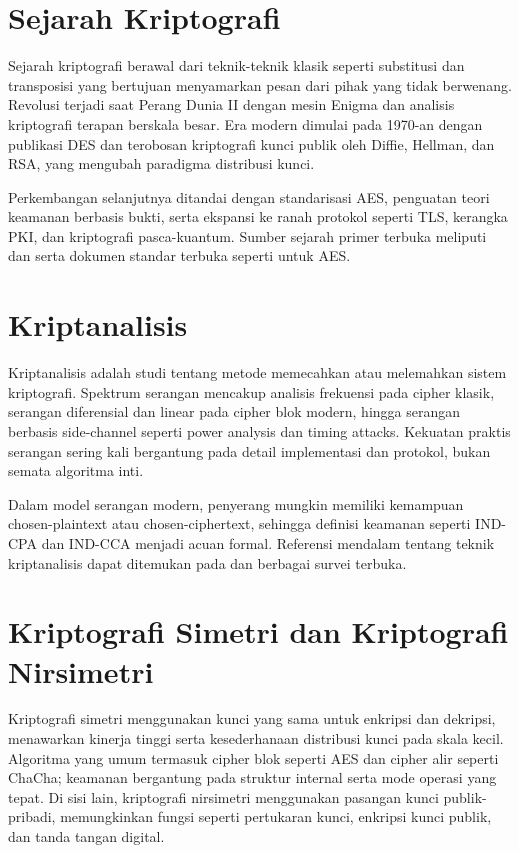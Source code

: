 \documentclass[../main.tex]{subfiles}
\begin{document}
\section{Sejarah Kriptografi}
Sejarah kriptografi berawal dari teknik-teknik klasik seperti substitusi dan transposisi yang bertujuan menyamarkan pesan dari pihak yang tidak berwenang. Revolusi terjadi saat Perang Dunia II dengan mesin Enigma dan analisis kriptografi terapan berskala besar. Era modern dimulai pada 1970-an dengan publikasi DES dan terobosan kriptografi kunci publik oleh Diffie, Hellman, dan RSA, yang mengubah paradigma distribusi kunci.

Perkembangan selanjutnya ditandai dengan standarisasi AES, penguatan teori keamanan berbasis bukti, serta ekspansi ke ranah protokol seperti TLS, kerangka PKI, dan kriptografi pasca-kuantum. Sumber sejarah primer terbuka meliputi \textcite{diffie1976new} dan \textcite{rsa1978} serta dokumen standar terbuka seperti \textcite{fips197} untuk AES.

\section{Kriptanalisis}
Kriptanalisis adalah studi tentang metode memecahkan atau melemahkan sistem kriptografi. Spektrum serangan mencakup analisis frekuensi pada cipher klasik, serangan diferensial dan linear pada cipher blok modern, hingga serangan berbasis side-channel seperti power analysis dan timing attacks. Kekuatan praktis serangan sering kali bergantung pada detail implementasi dan protokol, bukan semata algoritma inti.

Dalam model serangan modern, penyerang mungkin memiliki kemampuan chosen-plaintext atau chosen-ciphertext, sehingga definisi keamanan seperti IND-CPA dan IND-CCA menjadi acuan formal. Referensi mendalam tentang teknik kriptanalisis dapat ditemukan pada \textcite{biham1991differential,kocher1999dpa} dan berbagai survei terbuka.

\section{Kriptografi Simetri dan Kriptografi Nirsimetri}
Kriptografi simetri menggunakan kunci yang sama untuk enkripsi dan dekripsi, menawarkan kinerja tinggi serta kesederhanaan distribusi kunci pada skala kecil. Algoritma yang umum termasuk cipher blok seperti AES dan cipher alir seperti ChaCha; keamanan bergantung pada struktur internal serta mode operasi yang tepat. Di sisi lain, kriptografi nirsimetri menggunakan pasangan kunci publik-pribadi, memungkinkan fungsi seperti pertukaran kunci, enkripsi kunci publik, dan tanda tangan digital.
\end{document}
